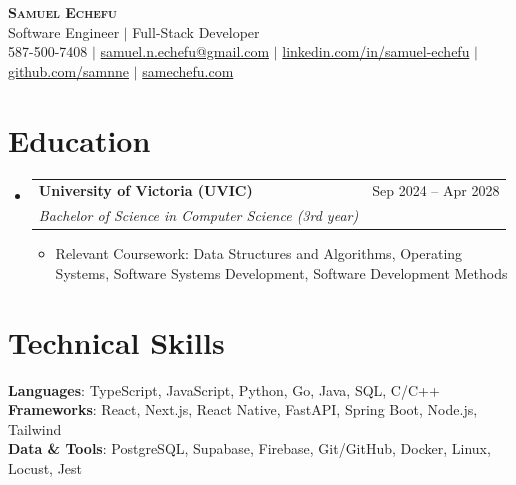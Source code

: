\documentclass[letterpaper,10pt]{article}
\makeatletter
\newcommand{\resumeItem}[1]{
  \item\small{
    {#1 \vspace{-1pt}}
  }
}
\newcommand{\resumeSubheading}[4]{
  \vspace{-2pt}\item
    \begin{tabular*}{0.97\textwidth}[t]{l@{\extracolsep{\fill}}r}
      \textbf{#1} & #2 \\
      \textit{\small#3} & \textit{\small #4} \\
    \end{tabular*}\vspace{-6pt}
}
\newcommand{\resumeSubHeadingListStart}{\begin{itemize}[leftmargin=0.15in, label={}]}
\newcommand{\resumeSubHeadingListEnd}{\end{itemize}}
\newcommand{\resumeItemListStart}{\begin{itemize}[label=$\bullet$, itemsep=0.15pt, topsep=0pt, parsep=0pt]}
\newcommand{\resumeItemListEnd}{\end{itemize}\vspace{-2pt}}
\makeatother
\begin{document}
\begin{center}
    \textbf{\Huge \scshape Samuel Echefu} \\ \vspace{3pt}
    \small Software Engineer $|$ Full-Stack Developer \\ \vspace{3pt}
    \small 587-500-7408 $|$ \href{mailto:samuel.n.echefu@gmail.com}{samuel.n.echefu@gmail.com} $|$ 
    \href{https://linkedin.com/in/samuel-echefu-251a21336}{linkedin.com/in/samuel-echefu} $|$
    \href{https://github.com/samnne}{github.com/samnne} $|$
    \href{https://samechefu.com}{samechefu.com}
\end{center}


\section{Education}
\resumeSubHeadingListStart
\resumeSubheading{University of Victoria (UVIC)}{Sep 2024 -- Apr 2028}{Bachelor of Science in Computer Science (3rd year)}{}
\resumeItemListStart
  \resumeItem{Relevant Coursework: Data Structures and Algorithms, Operating Systems, Software Systems Development, Software Development Methods}
\resumeItemListEnd
\resumeSubHeadingListEnd

\section{Technical Skills}
 \begin{itemize}[leftmargin=0.15in, label={}]
    \small{\item{
     \textbf{Languages}{: TypeScript, JavaScript, Python, Go, Java, SQL, C/C++} \\ \vspace{0pt}
     \textbf{Frameworks}{: React, Next.js, React Native, FastAPI, Spring Boot, Node.js, Tailwind} \\ \vspace{0pt}
     \textbf{Data \& Tools}{: PostgreSQL, Supabase, Firebase, Git/GitHub, Docker, Linux, Locust, Jest}
    }}
 \end{itemize}
\end{document}

